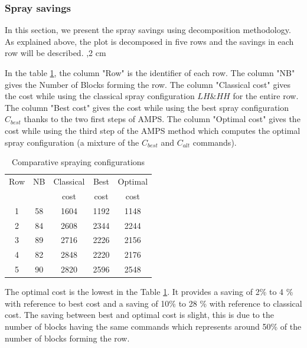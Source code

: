 \documentclass[preprint,3p,times,twocolumn]{elsarticle}
\begin{document}
\subsubsection{Spray savings}
In this section, we present the spray savings using decomposition methodology. As explained above, the plot is decomposed in five rows and the savings in each row will be described. 
,2 cm

In the table \ref{tb:CompCost}, the column "Row" is the identifier of each row. The column "NB" gives the Number of Blocks forming the row. The column "Classical cost" gives the cost while using the classical spray configuration $LH\&HH$ for the entire row. The column "Best cost" gives the cost while using the best spray configuration $C_{best}$ thanks to the two first steps of AMPS. The column "Optimal cost" gives the cost while using the third step of the AMPS method which computes the optimal spray configuration (a mixture of the $C_{best}$ and $C_{alt}$ commands). %
\begin{table}[ht]
\begin{center}
\begin{tabular}{|c|c|c|c|c|}
\hline 
Row		& NB  		&	Classical   &	Best    &  Optimal      \\
		&   		&	 cost  &	 cost   &   cost     \\ \hline
1		& 58		&   1604        	&	1192        &   1148           \\ \hline
2		& 84		&	2608            &	2344        &   2244              \\ \hline
3	    & 89	    &	2716        	&	2226        &   2156              \\ \hline
4   	& 82    	&	2848            &	2220        &   2176            \\ \hline
5	    & 90	    &	2820            &	2596        &   2548            \\ \hline
\end{tabular} 
\caption{Comparative spraying configurations}\label{tb:CompCost}
\end{center}
\end{table}

The optimal cost is the lowest in the Table \ref{tb:CompCost}. It provides a saving of 2\% to 4 \% with reference to best cost and a saving of 10\% to 28 \% with reference to classical cost. The saving between best and optimal cost is slight, this is due to the number of blocks having the same commands which represents around 50\% of the number of blocks forming the row.
\end{document}
